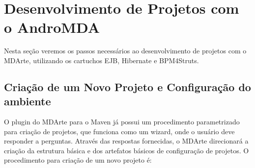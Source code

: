 \chapter{Desenvolvimento de Projetos com o AndroMDA}

Nesta seção veremos os passos necessários ao desenvolvimento de projetos com o MDArte, utilizando os cartuchos EJB, Hibernate e BPM4Struts.

\section{Criação de um Novo Projeto e Configuração do ambiente}

O plugin do MDArte para o Maven já possui um procedimento parametrizado para criação de projetos, que funciona como um wizard, onde o usuário deve responder a perguntas. Através das respostas fornecidas, o MDArte direcionará a criação da estrutura básica e dos artefatos básicos de configuração de projetos. O procedimento para criação de um novo projeto é:

